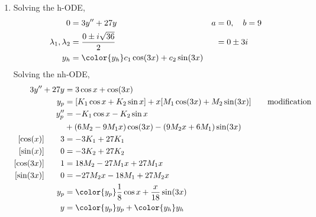 \begin{enumerate}
    \item Solving the h-ODE,
          \begin{align}
              0                        & = 3y'' + 27y                                &
              a                        & = 0, \quad b = 9                              \\
              \lambda_{1}, \lambda_{2} & = \frac{0 \pm i\sqrt{36}}{2}                &
                                       & = 0 \pm 3i                                    \\
              y_{h}                    & = \color{y_h} c_{1}\cos(3x) + c_{2}\sin(3x)
          \end{align}
          Solving the nh-ODE,
          \begin{align}
              3y'' + 27y          & = 3\cos x + \cos(3x)                               \\
              y_{p}               & = [K_{1} \cos x + K_{2} \sin x] + x[M_{1}\cos(3x)
              + M_{2}\sin(3x)]         \qquad \text{modification}                      \\
              y_{p}''             & = -K_{1}\cos x - K_{2}\sin x                       \\
                                  & +  (6M_{2} - 9M_{1}x)\cos(3x) - (9M_{2}x + 6M_{1})
              \sin(3x)                                                                 \\
              [\cos(x)] \qquad 3  & =  -3K_{1} + 27K_{1}                               \\
              [\sin(x)] \qquad 0  & =  -3K_{2} + 27K_{2}                               \\
              [\cos(3x)] \qquad 1 & =  18M_{2} - 27M_{1}x + 27M_{1}x                   \\
              [\sin(3x)] \qquad 0 & =  -27M_{2}x - 18M_{1} + 27M_{2}x                  \\
              y_{p}               & = \color{y_p} \frac{1}{8} \cos x + \frac{x}{18}
              \sin(3x)                                                                 \\
              y                   & = {\color{y_p} y_{p}} + {\color{y_h} y_{h}}
          \end{align}


\end{enumerate}
